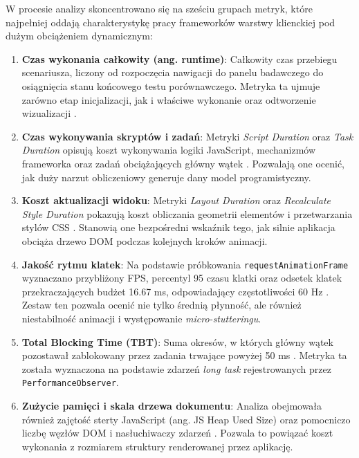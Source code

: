 \documentclass[12pt,openright,twoside]{report}
\begin{document}
W procesie analizy skoncentrowano się na sześciu grupach metryk, które najpełniej oddają charakterystykę pracy frameworków warstwy klienckiej pod dużym obciążeniem dynamicznym:

\begin{enumerate}
    \item \textbf{Czas wykonania całkowity (ang. runtime)}: Całkowity czas przebiegu scenariusza, liczony od rozpoczęcia nawigacji do panelu badawczego do osiągnięcia stanu końcowego testu porównawczego. Metryka ta ujmuje zarówno etap inicjalizacji, jak i właściwe wykonanie oraz odtworzenie wizualizacji \cite{Chrome_Runtime_Performance}.
    \item \textbf{Czas wykonywania skryptów i zadań}: Metryki \textit{Script Duration} oraz \textit{Task Duration} opisują koszt wykonywania logiki JavaScript, mechanizmów frameworka oraz zadań obciążających główny wątek \cite{V8_Engine_Docs}. Pozwalają one ocenić, jak duży narzut obliczeniowy generuje dany model programistyczny.
    \item \textbf{Koszt aktualizacji widoku}: Metryki \textit{Layout Duration} oraz \textit{Recalculate Style Duration} pokazują koszt obliczania geometrii elementów i przetwarzania stylów CSS \cite{Browser_Architecture}. Stanowią one bezpośredni wskaźnik tego, jak silnie aplikacja obciąża drzewo DOM podczas kolejnych kroków animacji.
    \item \textbf{Jakość rytmu klatek}: Na podstawie próbkowania \texttt{requestAnimationFrame} wyznaczano przybliżony FPS, percentyl 95 czasu klatki oraz odsetek klatek przekraczających budżet 16.67 ms, odpowiadający częstotliwości 60 Hz \cite{High_Perf_JS}. Zestaw ten pozwala ocenić nie tylko średnią płynność, ale również niestabilność animacji i występowanie \textit{micro-stutteringu}.
    \item \textbf{Total Blocking Time (TBT)}: Suma okresów, w których główny wątek pozostawał zablokowany przez zadania trwające powyżej 50 ms \cite{Web_Vitals}. Metryka ta została wyznaczona na podstawie zdarzeń \textit{long task} rejestrowanych przez \texttt{PerformanceObserver}.
    \item \textbf{Zużycie pamięci i skala drzewa dokumentu}: Analiza obejmowała również zajętość sterty JavaScript (ang. JS Heap Used Size) oraz pomocniczo liczbę węzłów DOM i nasłuchiwaczy zdarzeń \cite{V8_Engine_Docs}. Pozwala to powiązać koszt wykonania z rozmiarem struktury renderowanej przez aplikację.
\end{enumerate}
\end{document}
